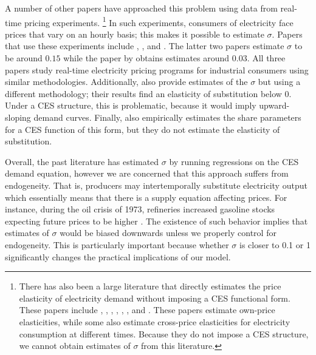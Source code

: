 \documentclass[11pt,a4paper,leqno]{extarticle}
\begin{document}
	A number of other papers have approached this problem using data from real-time pricing experiments.
	\footnote{ There has also been a large literature that directly estimates the price elasticity of electricity demand without imposing a CES functional form. These papers include \citet{Wolak}, \citet{Zarnikau}, \citet{Woo}, \citet{Zhou}, \citet{Reiss}, \citet{Fan}, and \citet{Deryugina}. These papers estimate own-price elasticities, while some also estimate cross-price elasticities for electricity consumption at different times. Because they do not impose a CES structure, we cannot obtain estimates of $\sigma$ from this literature. } In such experiments, consumers of electricity face prices that vary on an hourly basis; this makes it possible to estimate $\sigma$. Papers that use these experiments include \citet{Schwarz}, \citet{Herriges}, and \citet{KS1994}.
	The latter two papers estimate $\sigma$ to be around $0.15$ while the paper by \citeauthor{Schwarz}  obtains estimates around $0.03$. All three papers study real-time electricity pricing programs for industrial consumers using similar methodologies. Additionally, \citet{Aubin} also provide estimates of the $\sigma$ but using a different methodology; their results find an elasticity of substitution below 0. Under a CES structure, this is problematic, because it would imply upward-sloping demand curves. Finally, \citet{Moha2016} also empirically estimates the share parameters for a CES function of this form, but they do not estimate the elasticity of substitution. 
	
	Overall, the past literature has estimated $\sigma$ by running regressions on the CES demand equation, however we are concerned that this approach suffers from endogeneity. That is, producers may intertemporally substitute electricity output which essentially means that there is a supply equation affecting prices. For instance, during the oil crisis of 1973, refineries increased gasoline stocks expecting future prices to be higher \citep{genie}. The existence of such behavior implies that estimates of $\sigma$ would be biased downwards unless we properly control for endogeneity. This is particularly important because whether $\sigma$ is closer to 0.1 or 1 significantly changes the practical implications of our model. 
	
\end{document}
